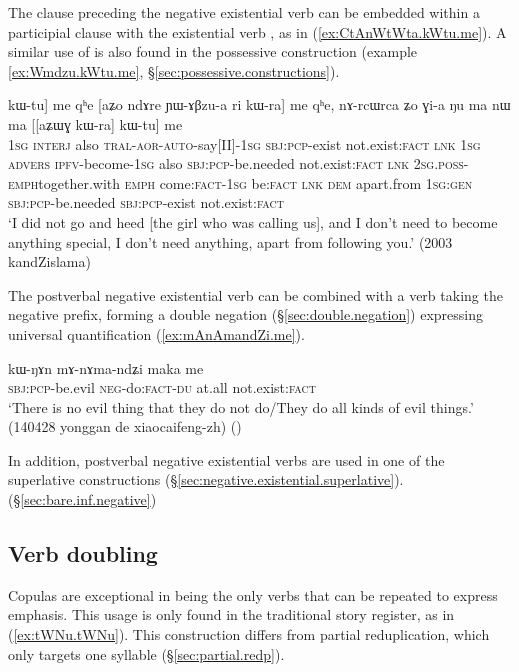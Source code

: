 The clause preceding the negative existential verb can be embedded within a participial clause with the existential verb , as in (\ref{ex:CtAnWtWta.kWtu.me}). A similar use of  is also found in the possessive construction (example \ref{ex:Wmdzu.kWtu.me}, §\ref{sec:possessive.constructions}).

\begin{exe}
\ex \label{ex:CtAnWtWta.kWtu.me} 
\gll [[aʑo joβ tɕi ɕ-tɤ-nɯ-tɯt-a] kɯ-tu] me qʰe  [aʑo ndɤre ɲɯ-ɤβzu-a ri kɯ-ra] me qʰe, nɤ-rcɯ\redp{}rca ʑo ɣi-a ŋu ma nɯ ma [[aʑɯɣ kɯ-ra] kɯ-tu] me \\
\textsc{1sg} \textsc{interj} also \textsc{tral}-\textsc{aor}-\textsc{auto}-say[II]-\textsc{1sg} \textsc{sbj}:\textsc{pcp}-exist not.exist:\textsc{fact} \textsc{lnk} \textsc{1sg} \textsc{advers} \textsc{ipfv}-become-\textsc{1sg} also \textsc{sbj}:\textsc{pcp}-be.needed not.exist:\textsc{fact} \textsc{lnk} \textsc{2sg}.\textsc{poss}-\textsc{emph}\redp{}together.with \textsc{emph} come:\textsc{fact}-\textsc{1sg} be:\textsc{fact} \textsc{lnk} \textsc{dem} apart.from \textsc{1sg}:\textsc{gen} \textsc{sbj}:\textsc{pcp}-be.needed \textsc{sbj}:\textsc{pcp}-exist not.exist:\textsc{fact} \\
\glt `I did not go and heed [the girl who was calling us], and I don't need to become anything special, I don't need anything, apart from following you.' (2003 kandZislama)
\end{exe}

The postverbal negative existential verb can be combined with a verb taking the negative prefix, forming a double negation (§\ref{sec:double.negation}) expressing universal quantification (\ref{ex:mAnAmandZi.me}).

\begin{exe}
\ex \label{ex:mAnAmandZi.me}
\gll kɯ-ŋɤn mɤ-nɤma-ndʑi maka me\\
\textsc{sbj}:\textsc{pcp}-be.evil \textsc{neg}-do:\textsc{fact}-\textsc{du} at.all not.exist:\textsc{fact}   \\
\glt `There is no evil thing that they do not do/They do all kinds of evil things.' (140428 yonggan de xiaocaifeng-zh)
()
 \end{exe}

In addition, postverbal negative existential verbs are used in one of the superlative constructions (§\ref{sec:negative.existential.superlative}).
(§\ref{sec:bare.inf.negative})

\subsection{Verb doubling} \label{sec:verb.doubling}
Copulas are exceptional in being the only verbs that can be repeated to express emphasis. This usage is only found in the traditional story register, as in (\ref{ex:tWNu.tWNu}). This construction differs from partial reduplication, which only targets one syllable (§\ref{sec:partial.redp}).

